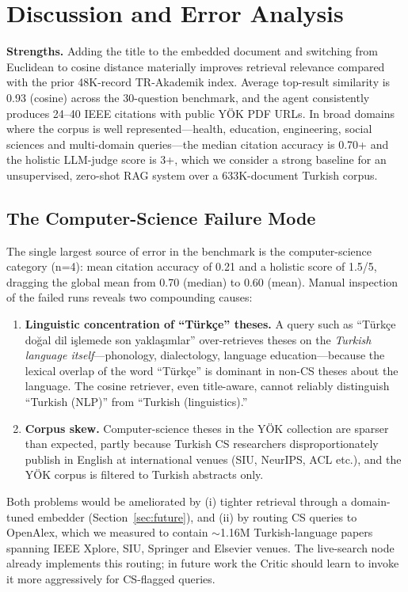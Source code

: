 \documentclass[conference]{IEEEtran}
\begin{document}
\section{Discussion and Error Analysis}

\textbf{Strengths.} Adding the title to the embedded document and switching
from Euclidean to cosine distance materially improves retrieval relevance
compared with the prior 48K-record TR-Akademik index. Average top-result
similarity is 0.93 (cosine) across the 30-question benchmark, and the
agent consistently produces 24--40 IEEE citations with public YÖK PDF
URLs. In broad domains where the corpus is well represented---health,
education, engineering, social sciences and multi-domain queries---the
median citation accuracy is 0.70+ and the holistic LLM-judge score is 3+,
which we consider a strong baseline for an unsupervised, zero-shot RAG
system over a 633K-document Turkish corpus.

\subsection{The Computer-Science Failure Mode}
\label{sec:cs-failure}

The single largest source of error in the benchmark is the computer-science
category (n=4): mean citation accuracy of 0.21 and a holistic score of
1.5/5, dragging the global mean from 0.70 (median) to 0.60 (mean). Manual
inspection of the failed runs reveals two compounding causes:

\begin{enumerate}
\item \textbf{Linguistic concentration of ``Türkçe'' theses.} A query such
as ``Türkçe doğal dil işlemede son yaklaşımlar'' over-retrieves theses on
the \emph{Turkish language itself}---phonology, dialectology, language
education---because the lexical overlap of the word ``Türkçe'' is
dominant in non-CS theses about the language. The cosine retriever, even
title-aware, cannot reliably distinguish ``Turkish (NLP)'' from
``Turkish (linguistics).''

\item \textbf{Corpus skew.} Computer-science theses in the YÖK collection
are sparser than expected, partly because Turkish CS researchers
disproportionately publish in English at international venues
(SIU, NeurIPS, ACL etc.), and the YÖK corpus is filtered to Turkish
abstracts only.
\end{enumerate}

Both problems would be ameliorated by (i) tighter retrieval through a
domain-tuned embedder (Section~\ref{sec:future}), and (ii) by routing
CS queries to OpenAlex, which we measured to contain
$\sim$1.16M Turkish-language papers spanning IEEE Xplore, SIU, Springer
and Elsevier venues. The live-search node already implements this
routing; in future work the Critic should learn to invoke it more
aggressively for CS-flagged queries.
\end{document}
